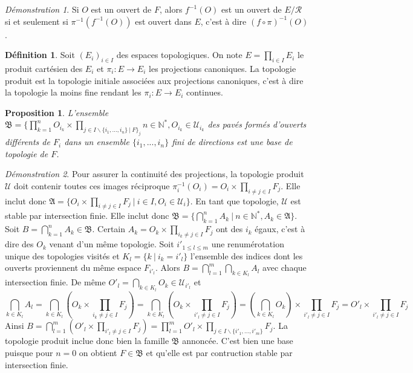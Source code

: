 \documentclass[a4paper, 11pt, french]{book}
\theoremstyle{plain} %
\newtheorem{proposition}{Proposition}
\theoremstyle{definition} %
\newtheorem{definition}{Définition}
\theoremstyle{remark} %
\newtheorem*{demonstration}{Démonstration}
\renewcommand{\setminus}{\backslash}
\newcommand{\1}{\mathds{1}}
\newcommand{\inv}[1]{#1^{-1}}
\newcommand{\N}{\mathbb{N}}
\renewcommand{\frak}[1]{\mathfrak{#1}}
\newcommand{\scr}[1]{\mathscr{#1}}
\newcommand\ens[2]{\{#1 \ |\ #2\}}
\begin{document}
\begin{demonstration}
	Si $O$ est un ouvert de $F$, alors $\inv{f}(O)$ est un ouvert de $E/\mathcal{R}$ si et seulement si $\inv{\pi}(\inv{f}(O))$ est ouvert dans $E$, c'est à dire $\inv{(f\circ\pi)}(O)$.
\end{demonstration}

\begin{definition}
	Soit $(E_i)_{i\in I}$ des espaces topologiques.
	On note $E=\prod_{i\in I} E_i$ le produit cartésien des $E_i$ et $\pi_i\colon E\rightarrow E_i$ les projections canoniques.
	La topologie produit est la topologie initiale associées aux projections canoniques, c'est à dire la topologie la moins fine rendant les $\pi_i\colon E\rightarrow E_i$ continues.
\end{definition}

\begin{proposition}
	L'ensemble $\frak{B}=\{\prod_{k=1}^nO_{i_k}\times\prod_{j\in I\setminus\ens{i_1, ..., i_n\}}F_j}{n\in\N^*, O_{i_k}\in\scr{U}_{i_k}}$ des pavés formés d'ouverts différents de $F_i$ dans un ensemble $\{i_1,...,i_n\}$ fini de directions est une base de topologie de $F$.
\end{proposition}

\begin{demonstration}
	Pour assurer la continuité des projections, la topologie produit $\scr{U}$ doit contenir toutes ces images réciproque $\inv{\pi_i}(O_i)=O_i\times\prod_{i\neq j\in I}F_j$.
	Elle inclut donc $\frak{A}=\ens{O_i\times\prod_{i\neq j\in I}F_j}{i\in I, O_i\in\scr{U}_i}$.
	En tant que topologie, $\scr{U}$ est stable par intersection finie.
	Elle inclut donc $\frak{B}=\ens{\bigcap_{k=1}^nA_k}{n\in\N^*, A_k\in\frak{A}}$.
	Soit $B=\bigcap_{k=1}^nA_k\in\frak{B}$.
	Certain $A_k=O_k\times\prod_{i_k\neq j\in I}F_j$ ont des $i_k$ égaux, c'est à dire des $O_k$ venant d'un même topologie.
	Soit $i'_{1\leqslant l\leqslant m}$ une renumérotation unique des topologies visités et $K_l=\ens{k}{i_k=i'_l}$ l'ensemble des indices dont les ouverts proviennent du même espace $F_{i'_l}$.
	Alors $B=\bigcap_{l=1}^m\bigcap_{k\in K_l}A_l$ avec chaque intersection finie.
	De même $O'_l=\bigcap_{k\in K_l}O_k\in\scr{U}_{i'_l}$ et
	$$
		\bigcap_{k\in K_l}A_l
		=\bigcap_{k\in K_l}(O_k\times\prod_{i_k\neq j\in I}F_j)
		=\bigcap_{k\in K_l}(O_k\times\prod_{i'_l\neq j\in I}F_j)
		=(\bigcap_{k\in K_l}O_k)\times\prod_{i'_l\neq j\in I}F_j
		=O'_l\times\prod_{i'_l\neq j\in I}F_j
	$$
	Ainsi $B=\bigcap_{l=1}^m(O'_l\times\prod_{i'_l\neq j\in I}F_j)=\prod_{l=1}^mO'_l\times\prod_{j\in I\setminus\{i'_1,...,i'_m\}}F_j$.
	La topologie produit inclue donc bien la famille $\frak{B}$ annoncée.
	C'est bien une base puisque pour $n=0$ on obtient $F\in\frak{B}$ et qu'elle est par contruction stable par intersection finie.
\end{demonstration}
\end{document}
